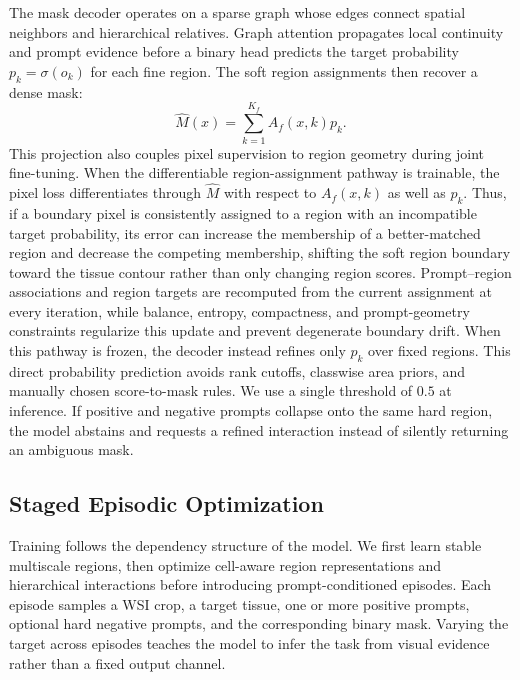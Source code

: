 \documentclass[letterpaper]{article} %
\begin{document}
The mask decoder operates on a sparse graph whose edges connect spatial neighbors and hierarchical relatives. Graph attention propagates local continuity and prompt evidence before a binary head predicts the target probability $p_k=\sigma(o_k)$ for each fine region. The soft region assignments then recover a dense mask:
\begin{equation}
    \hat{M}(x)=\sum_{k=1}^{K_f}A_f(x,k)p_k.
\end{equation}
This projection also couples pixel supervision to region geometry during joint fine-tuning. When the differentiable region-assignment pathway is trainable, the pixel loss differentiates through $\hat{M}$ with respect to $A_f(x,k)$ as well as $p_k$. Thus, if a boundary pixel is consistently assigned to a region with an incompatible target probability, its error can increase the membership of a better-matched region and decrease the competing membership, shifting the soft region boundary toward the tissue contour rather than only changing region scores. Prompt--region associations and region targets are recomputed from the current assignment at every iteration, while balance, entropy, compactness, and prompt-geometry constraints regularize this update and prevent degenerate boundary drift. When this pathway is frozen, the decoder instead refines only $p_k$ over fixed regions.
This direct probability prediction avoids rank cutoffs, classwise area priors, and manually chosen score-to-mask rules. We use a single threshold of $0.5$ at inference. If positive and negative prompts collapse onto the same hard region, the model abstains and requests a refined interaction instead of silently returning an ambiguous mask.

\subsection{Staged Episodic Optimization}

Training follows the dependency structure of the model. We first learn stable multiscale regions, then optimize cell-aware region representations and hierarchical interactions before introducing prompt-conditioned episodes. Each episode samples a WSI crop, a target tissue, one or more positive prompts, optional hard negative prompts, and the corresponding binary mask. Varying the target across episodes teaches the model to infer the task from visual evidence rather than a fixed output channel.
\end{document}
